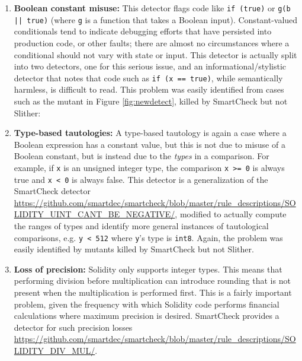 \begin{enumerate}
\item {\bf Boolean constant misuse:}  This detector flags code like {\tt if (true)} or {\tt g(b || true)} (where {\tt g} is a function that takes a Boolean input).  Constant-valued conditionals tend to indicate debugging efforts that have persisted into production code, or other faults; there are almost no circumstances where a conditional should not vary with state or input.  This detector is actually split into two detectors, one for this serious issue, and an informational/stylistic detector that notes that code such as {\tt if (x == true)}, while semantically harmless, is difficult to read.  This problem was easily identified from cases such as the mutant in Figure \ref{fig:newdetect}, killed by SmartCheck but not Slither:

\item {\bf Type-based tautologies:}  A type-based tautology is again a case where a Boolean expression has a constant value, but this is not due to misuse of a Boolean constant, but is instead due to the \emph{types} in a comparison.  For example, if {\tt x} is an unsigned integer type, the comparison {\tt x >= 0} is always true and {\tt x < 0} is always false.  This detector is a generalization of the SmartCheck detector \url{https://github.com/smartdec/smartcheck/blob/master/rule\_descriptions/SOLIDITY\_UINT\_CANT\_BE\_NEGATIVE/}, modified to actually compute the ranges of types and identify more general instances of tautological comparisons, e.g. {\tt y < 512} where {\tt y}'s type is {\tt int8}.  Again, the problem was easily identified by mutants killed by SmartCheck but not Slither.

\item {\bf Loss of precision:}  Solidity only supports integer types.  This means that performing division before multiplication can introduce rounding that is not present when the multiplication is performed first.  This is a fairly important problem, given the frequency with which Solidity code performs financial calculations where maximum precision is desired.  SmartCheck provides a detector for such precision losses \url{https://github.com/smartdec/smartcheck/blob/master/rule\_descriptions/SOLIDITY\_DIV\_MUL/}.
\end{enumerate}      


